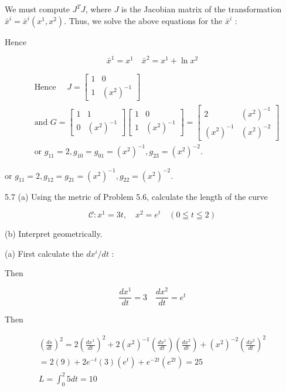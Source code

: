 \documentclass[10pt]{article}
\begin{document}
We must compute $J^{T} J$, where $J$ is the Jacobian matrix of the transformation $\bar{x}^{i}=\bar{x}^{i}\left(x^{1}, x^{2}\right)$. Thus, we solve the above equations for the $\bar{x}^{i}$ :

Hence

$$
\bar{x}^{1}=x^{1} \quad \bar{x}^{2}=x^{1}+\ln x^{2}
$$

$$
\begin{aligned}
& \text { Hence } \quad J=\left[\begin{array}{ll}
1 & 0 \\
1 & \left(x^{2}\right)^{-1}
\end{array}\right] \\
& \text { and } G=\left[\begin{array}{cc}
1 & 1 \\
0 & \left(x^{2}\right)^{-1}
\end{array}\right]\left[\begin{array}{cc}
1 & 0 \\
1 & \left(x^{2}\right)^{-1}
\end{array}\right]=\left[\begin{array}{cc}
2 & \left(x^{2}\right)^{-1} \\
\left(x^{2}\right)^{-1} & \left(x^{2}\right)^{-2}
\end{array}\right] \\
& \text { or } g_{11}=2, g_{10}=g_{01}=\left(x^{2}\right)^{-1}, g_{23}=\left(x^{2}\right)^{-2} \text {. }
\end{aligned}
$$

or $g_{11}=2, g_{12}=g_{21}=\left(x^{2}\right)^{-1}, g_{22}=\left(x^{2}\right)^{-2}$.

5.7 (a) Using the metric of Problem 5.6, calculate the length of the curve

$$
\mathscr{C}: x^{1}=3 t, \quad x^{2}=e^{t} \quad(0 \leqq t \leqq 2)
$$

(b) Interpret geometrically.

(a) First calculate the $d x^{i} / d t$ :

Then

$$
\frac{d x^{1}}{d t}=3 \quad \frac{d x^{2}}{d t}=e^{t}
$$

Then

$$
\begin{gathered}
\left(\frac{d s}{d t}\right)^{2}=2\left(\frac{d x^{1}}{d t}\right)^{2}+2\left(x^{2}\right)^{-1}\left(\frac{d x^{1}}{d t}\right)\left(\frac{d x^{2}}{d t}\right)+\left(x^{2}\right)^{-2}\left(\frac{d x^{2}}{d t}\right)^{2} \\
=2(9)+2 e^{-t}(3)\left(e^{t}\right)+e^{-2 t}\left(e^{2 t}\right)=25 \\
L=\int_{0}^{2} 5 d t=10
\end{gathered}
$$
\end{document}
